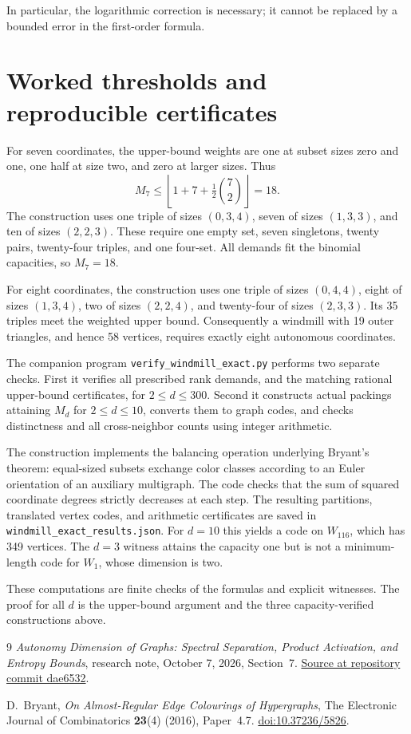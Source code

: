 \documentclass[11pt]{article}
\theoremstyle{definition}
\numberwithin{equation}{section}
\begin{document}
In particular, the logarithmic correction is necessary; it cannot be
replaced by a bounded error in the first-order formula.

\section{Worked thresholds and reproducible certificates}

For seven coordinates, the upper-bound weights are one at subset sizes
zero and one, one half at size two, and zero at larger sizes. Thus
\[
 M_7\leq
 \left\lfloor1+7+\tfrac12\binom72\right\rfloor=18.
\]
The construction uses one triple of sizes $(0,3,4)$, seven of sizes
$(1,3,3)$, and ten of sizes $(2,2,3)$. These require one empty set,
seven singletons, twenty pairs, twenty-four triples, and one four-set.
All demands fit the binomial capacities, so $M_7=18$.

For eight coordinates, the construction uses one triple of sizes
$(0,4,4)$, eight of sizes $(1,3,4)$, two of sizes $(2,2,4)$, and
twenty-four of sizes $(2,3,3)$. Its 35 triples meet the weighted upper
bound. Consequently a windmill with 19 outer triangles, and hence
58 vertices, requires exactly eight autonomous coordinates.

The companion program \texttt{verify\_windmill\_exact.py} performs two
separate checks. First it verifies all prescribed rank demands, and the
matching rational upper-bound certificates, for $2\leq d\leq300$.
Second it constructs actual packings attaining $M_d$ for
$2\leq d\leq10$, converts them to graph codes, and checks distinctness
and all cross-neighbor counts using integer arithmetic.

The construction implements the balancing operation underlying
Bryant's theorem: equal-sized subsets exchange color classes according
to an Euler orientation of an auxiliary multigraph. The code checks
that the sum of squared coordinate degrees strictly decreases at each
step. The resulting partitions, translated vertex codes, and arithmetic
certificates are saved in \texttt{windmill\_exact\_results.json}.
For $d=10$ this yields a code on $W_{116}$, which has 349 vertices.
The $d=3$ witness attains the capacity one but is not a minimum-length
code for $W_1$, whose dimension is two.

These computations are finite checks of the formulas and explicit
witnesses. The proof for all $d$ is the upper-bound argument and the
three capacity-verified constructions above.

\begin{thebibliography}{9}
\emph{Autonomy Dimension of Graphs: Spectral Separation, Product
Activation, and Entropy Bounds}, research note, October 7, 2026,
Section~7.
\href{https://github.com/geneweng/math-open/blob/dae6532/autonomy_dimension.tex}
{Source at repository commit dae6532}.

D.~Bryant, \emph{On Almost-Regular Edge Colourings of Hypergraphs},
The Electronic Journal of Combinatorics \textbf{23}(4) (2016), Paper~4.7.
\href{https://doi.org/10.37236/5826}{doi:10.37236/5826}.
\end{thebibliography}
\end{document}
